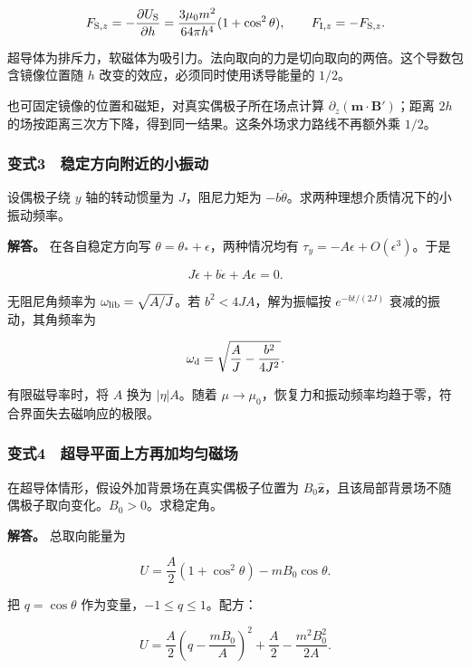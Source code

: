 \documentclass[12pt,a4paper,fontset=fandol]{ctexart}
\begin{document}
\[
F_{{\rm S},z}=-\frac{\partial U_{\rm S}}{\partial h}
=\frac{3\mu_0m^2}{64\pi h^4}(1+\cos^2\theta),
\qquad F_{{\rm I},z}=-F_{{\rm S},z}.
\]

超导体为排斥力，软磁体为吸引力。法向取向的力是切向取向的两倍。这个导数包含镜像位置随
\(h\) 改变的效应，必须同时使用诱导能量的 \(1/2\)。

也可固定镜像的位置和磁矩，对真实偶极子所在场点计算
\(\partial_z(\boldsymbol m\cdot\boldsymbol B')\)；距离 \(2h\)
的场按距离三次方下降，得到同一结果。这条外场求力路线不再额外乘 \(1/2\)。

\subsubsection{变式3　稳定方向附近的小振动}\label{ux53d8ux5f0f3-ux7a33ux5b9aux65b9ux5411ux9644ux8fd1ux7684ux5c0fux632fux52a8}

设偶极子绕 \(y\) 轴的转动惯量为 \(J\)，阻尼力矩为
\(-b\dot\theta\)。求两种理想介质情况下的小振动频率。

\textbf{解答。} 在各自稳定方向写
\(\theta=\theta_*+\epsilon\)，两种情况均有
\(\tau_y=-A\epsilon+O(\epsilon^3)\)。于是

\[
J\ddot\epsilon+b\dot\epsilon+A\epsilon=0.
\]

无阻尼角频率为 \(\omega_{\rm lib}=\sqrt{A/J}\)。若
\(b^2<4JA\)，解为振幅按 \(e^{-bt/(2J)}\) 衰减的振动，其角频率为

\[
\omega_{\rm d}=\sqrt{\frac AJ-\frac{b^2}{4J^2}}.
\]

有限磁导率时，将 \(A\) 换为 \(|\eta|A\)。随着
\(\mu\to\mu_0\)，恢复力和振动频率均趋于零，符合界面失去磁响应的极限。

\subsubsection{变式4　超导平面上方再加均匀磁场}\label{ux53d8ux5f0f4-ux8d85ux5bfcux5e73ux9762ux4e0aux65b9ux518dux52a0ux5747ux5300ux78c1ux573a}

在超导体情形，假设外加背景场在真实偶极子位置为
\(B_0\hat{\boldsymbol z}\)，且该局部背景场不随偶极子取向变化。\(B_0>0\)。求稳定角。

\textbf{解答。} 总取向能量为

\[
U=\frac A2(1+\cos^2\theta)-mB_0\cos\theta.
\]

把 \(q=\cos\theta\) 作为变量，\(-1\le q\le1\)。配方：

\[
U=\frac A2\left(q-\frac{mB_0}{A}\right)^2
+\frac A2-\frac{m^2B_0^2}{2A}.
\]
\end{document}

